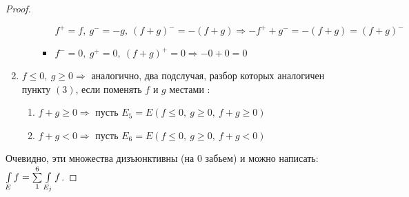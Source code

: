 \begin{proof}
\begin{enumerate}[resume]
\begin{enumerate}
\begin{itemize}
						$ f^+ = f, \: g^- = -g, \: (f + g)^- = -(f + g) \Rightarrow  -f^+ + g^- = -(f + g) = (f + g)^- $
						\item
						$ f^- = 0, \: g^+ = 0, \: (f + g)^+ = 0 \Rightarrow -0 + 0 = 0$ 
					\end{itemize}
			\end{enumerate}
		\item
			$f \leqslant 0, \: g\geqslant 0 \Rightarrow$ аналогично, два подслучая, разбор которых аналогичен пункту $(3)$, если поменять $f$ и $g$ местами : 
			\begin{enumerate}
				\item 
					$f + g \geqslant 0 \Rightarrow$ пусть $E_5 = E(f \leqslant 0, \: g\geqslant 0, \: f + g \geqslant 0)$
				\item
					$f + g < 0 \Rightarrow$ пусть $E_6 = E(f \leqslant 0, \: g\geqslant 0, \: f + g < 0)$
			\end{enumerate}
	\end{enumerate}
	Очевидно, эти множества дизъюнктивны (на $0$ забьем) и можно написать: $\int\limits_{E} f = \sum\limits_{1}^{6}\int\limits_{E_j} f$.
\end{proof}



